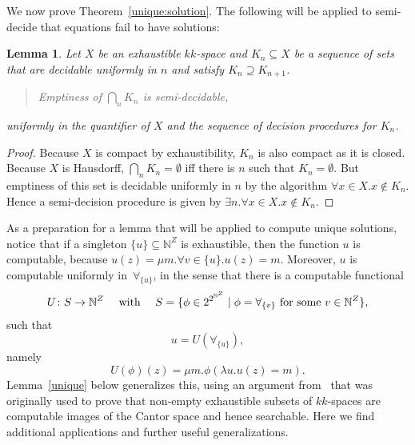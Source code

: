 \documentclass[10pt]{article}
\newtheorem{lemma}[cor]{Lemma}
\newcommand{\N}{\mathbb{N}}
\begin{document}
\medskip
We now prove Theorem~\ref{unique:solution}.  The following will be
applied to semi-decide that equations fail to have solutions:
\begin{lemma} \label{empty} Let $X$ be an exhaustible $kk$-space and
  $K_n \subseteq X$ be a sequence of sets that are decidable uniformly
  in $n$ and satisfy $K_n \supseteq K_{n+1}$.
\begin{quote}
  Emptiness of $\bigcap_n K_n$ is semi-decidable,
\end{quote}
uniformly in the quantifier of $X$ and the sequence of decision
procedures for $K_n$.
\end{lemma}
\begin{proof} 
  Because $X$ is compact by exhaustibility, $K_n$ is also compact as
  it is closed.  Because $X$ is Hausdorff, $\bigcap_n K_n = \emptyset$
  iff there is $n$ such that $K_n=\emptyset$.  But emptiness of this
  set is decidable uniformly in $n$ by the algorithm $\forall x \in X.
  x \not\in K_n$.  Hence a semi-decision procedure is given by
  $\exists n.\forall x \in X. x \not\in K_n$.
\end{proof}

As a preparation for a lemma that will be applied to
compute unique solutions, notice that if a singleton $\{u\} \subseteq
\N^Z$ is exhaustible, then the function $u$ is computable, because
$u(z) = \mu m.\forall v \in\{ u \}.u(z)=m$. Moreover, $u$ is
computable uniformly in~$\forall_{\{u\}}$, in the sense that there is
a computable functional
\[ \text{$U \colon S \to \N^Z$ \quad with \quad $S = \{ \phi \in
  2^{2^{\N^Z}} \mid \text{$\phi=\forall_{\{v\}}$ for some $v \in
    \N^Z$} \}$},
\]
such that \[ u=U\left(\forall_{\{u\}}\right),\] 
namely
\[
U(\phi)(z)=\mu m.\phi(\lambda u.u(z)=m).
\]
%
Lemma~\ref{unique} below generalizes this, using an
argument from~\cite{escardo:exhaustible} that was originally used to
prove that non-empty exhaustible subsets of $kk$-spaces are computable
images of the Cantor space and hence searchable.  Here we find
additional applications and further useful generalizations.
\end{document}

